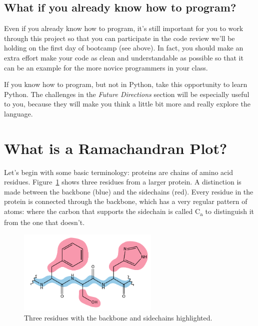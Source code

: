 \documentclass{article}
\newcommand{\calpha}{C\textsubscript{\textgreek{a}}}
\begin{document}
\subsection{What if you already know how to program?}

Even if you already know how to program, it's still important for you to work 
through this project so that you can participate in the code review we'll be 
holding on the first day of bootcamp (see above).  In fact, you should make an 
extra effort make your code as clean and understandable as possible so that it 
can be an example for the more novice programmers in your class.

If you know how to program, but not in Python, take this opportunity to learn 
Python.  The challenges in the \emph{Future Directions} section will be 
especially useful to you, because they will make you think a little bit more 
and really explore the language.

\section{What is a Ramachandran Plot?}

Let's begin with some basic terminology: proteins are chains of amino acid 
residues.  Figure~\ref{fig:three-residues} shows three residues from a larger 
protein.  A distinction is made between the backbone (blue) and the sidechains 
(red).  Every residue in the protein is connected through the backbone, which 
has a very regular pattern of atoms:  where the carbon that supports the sidechain is 
called \calpha{} to distinguish it from the one that doesn't.

\begin{figure}[h]
 \centering
 \includegraphics[width=0.60\textwidth]{three-residues}
 \caption{Three residues with the backbone and sidechains highlighted.}
 \label{fig:three-residues}
\end{figure}
\end{document}
